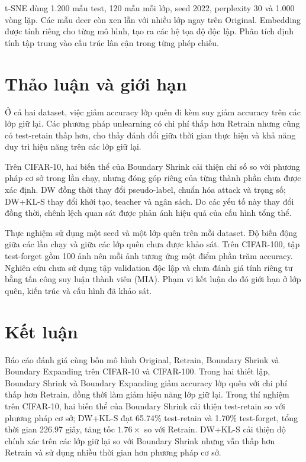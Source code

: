 \documentclass[conference]{IEEEtran}
\begin{document}
 t-SNE dùng 1.200 mẫu test, 120 mẫu mỗi lớp, seed 2022, perplexity 30 và 1.000 vòng lặp. Các mẫu deer còn xen lẫn với nhiều lớp ngay trên Original. Embedding được tính riêng cho từng mô hình, tạo ra các hệ tọa độ độc lập. Phân tích định tính tập trung vào cấu trúc lân cận trong từng phép chiếu.

\section{Thảo luận và giới hạn}
Ở cả hai dataset, việc giảm accuracy lớp quên đi kèm suy giảm accuracy trên các lớp giữ lại. Các phương pháp unlearning có chi phí thấp hơn Retrain nhưng cũng có test-retain thấp hơn, cho thấy đánh đổi giữa thời gian thực hiện và khả năng duy trì hiệu năng trên các lớp giữ lại.

Trên CIFAR-10, hai biến thể của Boundary Shrink cải thiện chỉ số so với phương pháp cơ sở trong lần chạy, nhưng đóng góp riêng của từng thành phần chưa được xác định. DW đồng thời thay đổi pseudo-label, chuẩn hóa attack và trọng số; DW+KL-S thay đổi khởi tạo, teacher và ngân sách. Do các yếu tố này thay đổi đồng thời, chênh lệch quan sát được phản ánh hiệu quả của cấu hình tổng thể.

Thực nghiệm sử dụng một seed và một lớp quên trên mỗi dataset. Độ biến động giữa các lần chạy và giữa các lớp quên chưa được khảo sát. Trên CIFAR-100, tập test-forget gồm 100 ảnh nên mỗi ảnh tương ứng một điểm phần trăm accuracy. Nghiên cứu chưa sử dụng tập validation độc lập và chưa đánh giá tính riêng tư bằng tấn công suy luận thành viên (MIA). Phạm vi kết luận do đó giới hạn ở lớp quên, kiến trúc và cấu hình đã khảo sát.

\section{Kết luận}
Báo cáo đánh giá cùng bốn mô hình Original, Retrain, Boundary Shrink và Boundary Expanding trên CIFAR-10 và CIFAR-100. Trong hai thiết lập, Boundary Shrink và Boundary Expanding giảm accuracy lớp quên với chi phí thấp hơn Retrain, đồng thời làm giảm hiệu năng lớp giữ lại. Trong thí nghiệm trên CIFAR-10, hai biến thể của Boundary Shrink cải thiện test-retain so với phương pháp cơ sở; DW+KL-S đạt 65.74\% test-retain và 1.70\% test-forget, tổng thời gian 226.97 giây, tăng tốc $1.76\times$ so với Retrain. DW+KL-S cải thiện độ chính xác trên các lớp giữ lại so với Boundary Shrink nhưng vẫn thấp hơn Retrain và sử dụng nhiều thời gian hơn phương pháp cơ sở.
\end{document}
